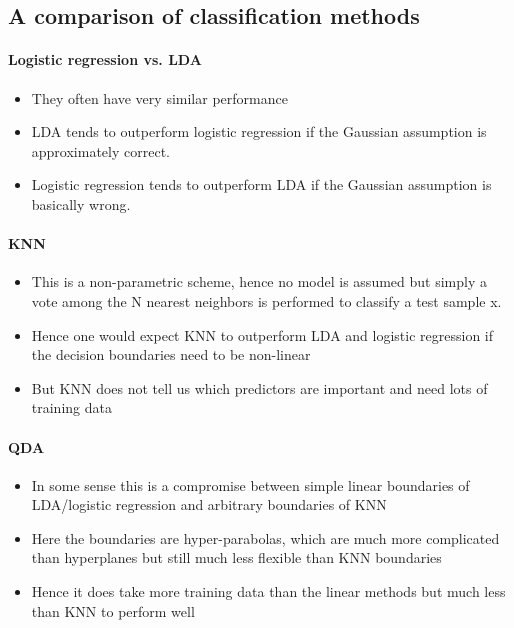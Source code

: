 \documentclass[../document.tex]{subfiles}
\begin{document}
	\subsection{A comparison of classification methods}

	\paragraph{Logistic regression vs. LDA}
	\begin{itemize}
		\item They often have very similar performance
		\item LDA tends to outperform logistic regression if the Gaussian assumption is approximately correct.
		\item Logistic regression tends to outperform LDA if the Gaussian assumption is basically wrong.
	\end{itemize}

	\paragraph{KNN}
	\begin{itemize}
		\item This is a non-parametric scheme, hence no model is assumed but simply a vote among the N nearest neighbors is performed to classify a test sample x.
		\item Hence one would expect KNN to outperform LDA and logistic regression if the decision boundaries need to be non-linear
		\item But KNN does not tell us which predictors are important and need lots of training data
	\end{itemize}

	\paragraph{QDA}
	\begin{itemize}
		\item In some sense this is a compromise between simple linear boundaries of LDA/logistic regression and arbitrary boundaries of KNN
		\item Here the boundaries are hyper-parabolas, which are much more complicated than hyperplanes but still much less flexible than KNN boundaries
		\item Hence it does take more training data than the linear methods but much less than KNN to perform well
	\end{itemize}
\end{document}
